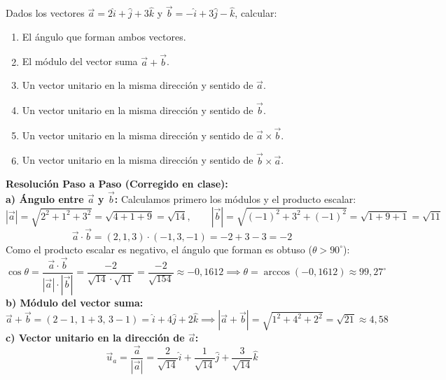 \begin{ejercicio}
Dados los vectores $\vec{a} = 2\hat{i} + \hat{j} + 3\hat{k}$ y $\vec{b} = -\hat{i} + 3\hat{j} - \hat{k}$, calcular:
\begin{enumerate}[label=\alph*)]
    \item El ángulo que forman ambos vectores.
    \item El módulo del vector suma $\vec{a} + \vec{b}$.
    \item Un vector unitario en la misma dirección y sentido de $\vec{a}$.
    \item Un vector unitario en la misma dirección y sentido de $\vec{b}$.
    \item Un vector unitario en la misma dirección y sentido de $\vec{a} \times \vec{b}$.
    \item Un vector unitario en la misma dirección y sentido de $\vec{b} \times \vec{a}$.
\end{enumerate}
\tcbline
\textbf{Resolución Paso a Paso (Corregido en clase):}\\[4pt]
\textbf{a) Ángulo entre $\vec{a}$ y $\vec{b}$:} Calculamos primero los módulos y el producto escalar:
\begin{equation}
    |\vec{a}| = \sqrt{2^2 + 1^2 + 3^2} = \sqrt{4 + 1 + 9} = \sqrt{14}, \qquad |\vec{b}| = \sqrt{(-1)^2 + 3^2 + (-1)^2} = \sqrt{1 + 9 + 1} = \sqrt{11}
\end{equation}
\begin{equation}
    \vec{a} \cdot \vec{b} = (2, 1, 3) \cdot (-1, 3, -1) = -2 + 3 - 3 = -2
\end{equation}
Como el producto escalar es negativo, el ángulo que forman es obtuso ($\theta > 90^\circ$):
\begin{equation}
    \cos\theta = \frac{\vec{a}\cdot\vec{b}}{|\vec{a}|\cdot|\vec{b}|} = \frac{-2}{\sqrt{14}\cdot\sqrt{11}} = \frac{-2}{\sqrt{154}} \approx -0{,}1612 \implies \theta = \arccos(-0{,}1612) \approx 99{,}27^\circ
\end{equation}
\textbf{b) Módulo del vector suma:}
\begin{equation}
    \vec{a} + \vec{b} = (2-1,\, 1+3,\, 3-1) = \hat{i} + 4\hat{j} + 2\hat{k} \implies |\vec{a}+\vec{b}| = \sqrt{1^2 + 4^2 + 2^2} = \sqrt{21} \approx 4{,}58
\end{equation}
\textbf{c) Vector unitario en la dirección de $\vec{a}$:}
\begin{equation}
    \vec{u}_a = \frac{\vec{a}}{|\vec{a}|} = \frac{2}{\sqrt{14}}\hat{i} + \frac{1}{\sqrt{14}}\hat{j} + \frac{3}{\sqrt{14}}\hat{k}

\end{equation}
\end{ejercicio}
